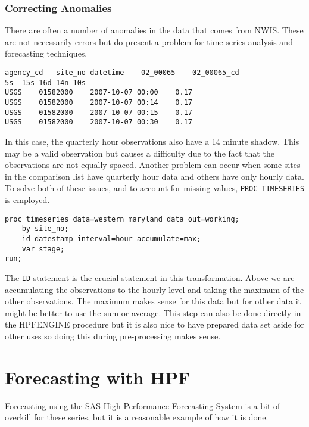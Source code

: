 \documentclass[10pt]{sugconf-ish}
\begin{document}
\subsubsection{Correcting Anomalies}

There are often a number of anomalies in the data that comes from NWIS.  These are not necessarily errors but do present a problem for time series analysis and forecasting techniques. 
\begin{verbatim}
agency_cd	site_no	datetime	02_00065	02_00065_cd
5s	15s	16d	14n	10s
USGS	01582000	2007-10-07 00:00	0.17	
USGS	01582000	2007-10-07 00:14	0.17	
USGS	01582000	2007-10-07 00:15	0.17	
USGS	01582000	2007-10-07 00:30	0.17	
\end{verbatim}
In this case, the quarterly hour observations also have a 14 minute shadow.  This may be a valid observation but causes a difficulty due to the fact that the observations are not equally spaced.  Another problem can occur when some sites in the comparison list have quarterly hour data and others have only hourly data.  To solve both of these issues, and to account for missing values, \texttt{PROC TIMESERIES} is employed.

\begin{verbatim}
proc timeseries data=western_maryland_data out=working;
	by site_no;
	id datestamp interval=hour accumulate=max;
	var stage;
run;
\end{verbatim}

The \texttt{ID} statement is the crucial statement in this transformation.  Above we are accumulating the observations to the hourly level and taking the maximum of the other observations.  The maximum makes sense for this data but for other data it might  be better to use the sum or average.  This step can also be done directly in the HPFENGINE procedure but it is also nice to have prepared data set aside for other uses so doing this during pre-processing makes sense.

\section{Forecasting with HPF}

Forecasting using the SAS High Performance Forecasting System is a bit of overkill for these series, but it is a reasonable example of how it is done.  
\end{document}
